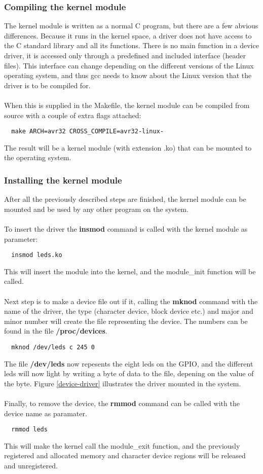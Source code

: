 \subsubsection{Compiling the kernel module}
The kernel module is written as a normal C program, but there are a few
abvious differences. Because it runs in the kernel space, a driver
does not have access to the C standard library and all its functions.
There is no main function in a device driver, it is accessed only
through a predefined and included interface (header files). 
This interface can change
depending on the different versions of the Linux operating system, and
thus gcc needs to know about the Linux version that the driver is to be
compiled for.\\
\\
When this is supplied in the Makefile, the kernel module can be compiled
from source with a couple of extra flags attached:
\begin{verbatim}
  make ARCH=avr32 CROSS_COMPILE=avr32-linux-
\end{verbatim}
The result will be a kernel module (with extension .ko) that can be
mounted to the operating system.

\subsubsection{Installing the kernel module}
After all the previously described steps are finished, the kernel
module can be mounted and be used by any other program on the system.\\
\\
To insert the driver the \textbf{insmod} command is called with the
kernel module as parameter:
\begin{verbatim}
  insmod leds.ko
\end{verbatim}
This will insert the module into the kernel, and the module\_init
function will be called.\\
\\
Next step is to make a device file out if it, calling the
\textbf{mknod} command with the name of the driver,
the type (character device, block device etc.)
and major and minor number will create the file representing the device.
The numbers can be found in the file {\bf /proc/devices}.
\begin{verbatim}
  mknod /dev/leds c 245 0
\end{verbatim}
The file \textbf{/dev/leds} now repesents the eight leds on the GPIO,
and the different leds will now light by writing a byte
of data to the file, depening on the value of the byte.
Figure \ref{device-driver} illustrates the driver mounted in the
system.\\
\\
Finally, to remove the device, the \textbf{rmmod} command can be called
with the device name as paramater.
\begin{verbatim}
  rmmod leds
\end{verbatim}
This will make the kernel call the module\_exit function, and the
previously registered and allocated memory and character device regions
will be released and unregistered.
